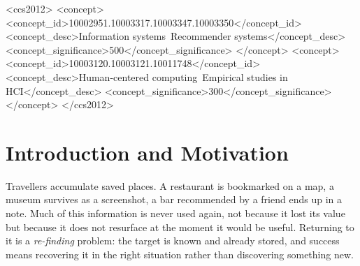 \documentclass[acmlarge]{acmart}
\begin{document}
\begin{CCSXML}
<ccs2012>
   <concept>
       <concept_id>10002951.10003317.10003347.10003350</concept_id>
       <concept_desc>Information systems~Recommender systems</concept_desc>
       <concept_significance>500</concept_significance>
   </concept>
   <concept>
       <concept_id>10003120.10003121.10011748</concept_id>
       <concept_desc>Human-centered computing~Empirical studies in HCI</concept_desc>
       <concept_significance>300</concept_significance>
   </concept>
</ccs2012>
\end{CCSXML}



\maketitle

\clearpage
\begingroup
  \hypersetup{linkcolor=black}%
  \setcounter{tocdepth}{2}%
  \tableofcontents
\endgroup
\clearpage

\section{Introduction and Motivation}
\label{sec:intro}

Travellers accumulate saved places. A restaurant is bookmarked on a map, a
museum survives as a screenshot, a bar recommended by a friend ends up in a
note. Much of this information is never used again, not because it lost its
value but because it does not resurface at the moment it would be useful.
Returning to it is a \emph{re-finding} problem: the target is known and
already stored, and success means recovering it in the right situation
rather than discovering something new.
\end{document}

